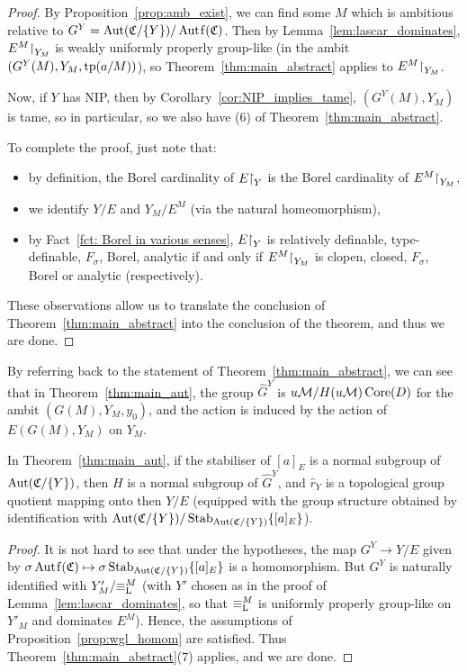 	\begin{proof}
		By Proposition~\ref{prop:amb_exist}, we can find some $M$ which is ambitious relative to $G^Y=\Aut(\fC/\{Y\})/\Autf(\fC)$. Then by Lemma~\ref{lem:lascar_dominates}, $E^M\mathord{\upharpoonright}_{Y_M}$ is weakly uniformly properly group-like (in the ambit $(G^Y(M),Y_M,\operatorname{{tp}}(a/M))$), so Theorem~\ref{thm:main_abstract} applies to $E^M\mathord{\upharpoonright}_{Y_M}$.
		
		Now, if $Y$ has NIP, then by Corollary~\ref{cor:NIP_implies_tame}, $(G^Y(M), Y_M)$ is tame, so in particular,  so we also have (6) of Theorem~\ref{thm:main_abstract}.
		
		To complete the proof, just note that:
		\begin{itemize}
			\item
			by definition, the Borel cardinality of $E\mathord{\upharpoonright}_Y$ is the Borel cardinality of $E^M\mathord{\upharpoonright}_{Y_M}$,
			\item
			we identify $Y/E$ and $Y_M/{E^M}$ (via the natural homeomorphism),
			\item
			by Fact~\ref{fct: Borel in various senses}, $E\mathord{\upharpoonright}_Y$ is relatively definable, type-definable, $F_\sigma$, Borel, analytic if and only if $E^M\mathord{\upharpoonright}_{Y_M}$ is clopen, closed, $F_\sigma$, Borel or analytic (respectively).
		\end{itemize}
		These observations allow us to translate the conclusion of Theorem~\ref{thm:main_abstract} into the conclusion of the theorem, and thus we are done.
	\end{proof}
	
	\begin{rem}
		By referring back to the statement of Theorem~\ref{thm:main_abstract}, we can see that in Theorem~\ref{thm:main_aut}, the group $\hat G^Y$ is $u{\mathcal M}/H(u{\mathcal M})\operatorname{{Core}}(D)$ for the ambit $(G(M),Y_M,y_0)$, and the action is induced by the action of $E(G(M),Y_M)$ on $Y_M$.\xqed{\lozenge}
	\end{rem}
	
	\begin{prop}
		\label{prop:orbital_in_main_aut}
		In Theorem~\ref{thm:main_aut}, if the stabiliser of $[a]_E$ is a normal subgroup of $\operatorname{{Aut}}({\mathfrak C}/\{Y\})$, then $H$ is a normal subgroup of $\hat G^Y$, and $\hat r_Y$ is a topological group quotient mapping onto then $Y/E$ (equipped with the group structure obtained by identification with $\operatorname{{Aut}}({\mathfrak C}/\{Y\})/\operatorname{{Stab}}_{\operatorname{{Aut}}({\mathfrak C}/\{Y\})}\{[a]_E\}$).
	\end{prop}
	\begin{proof}
		It is not hard to see that under the hypotheses, the map $G^Y\to Y/E$ given by $\sigma\Autf(\fC)\mapsto \sigma \Stab_{\Aut(\fC/\{Y\})}\{[a]_E\}$ is a homomorphism. But $G^Y$ is naturally identified with $Y'_M/{\equiv_{\mathrm{L}}^M}$ (with $Y'$  chosen as in the proof of Lemma~\ref{lem:lascar_dominates}, so that ${\equiv_{\mathrm{L}}^M}$ is uniformly properly group-like on $Y'_M$ and dominates $E^M$). Hence, the assumptions of Proposition~\ref{prop:wgl_homom} are satisfied. Thus Theorem~\ref{thm:main_abstract}(7) applies, and we are done.
	\end{proof}
	
